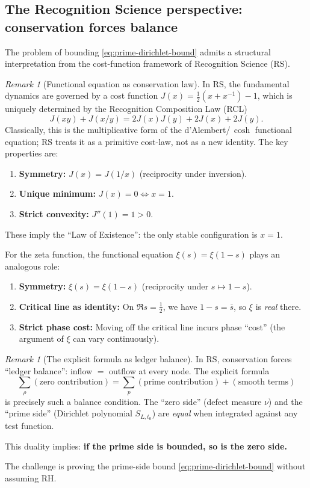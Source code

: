 \documentclass[11pt]{article}
\theoremstyle{definition}
\theoremstyle{remark}
\newtheorem{remark}[theorem]{Remark}
\theoremstyle{definition}
\begin{document}
\subsection*{The Recognition Science perspective: conservation forces balance}

The problem of bounding \eqref{eq:prime-dirichlet-bound} admits a structural interpretation from the cost-function framework of Recognition Science (RS).

\begin{remark}[Functional equation as conservation law]\label{rem:rs-conservation}
In RS, the fundamental dynamics are governed by a cost function $J(x) = \frac{1}{2}(x + x^{-1}) - 1$, which is uniquely determined by the Recognition Composition Law (RCL)
\[
  J(xy) + J(x/y) = 2J(x)J(y) + 2J(x) + 2J(y).
\]
Classically, this is the multiplicative form of the d'Alembert/\,$\cosh$ functional equation; RS treats it as a primitive cost-law, not as a new identity.
The key properties are:
\begin{enumerate}
\item \textbf{Symmetry:} $J(x) = J(1/x)$ (reciprocity under inversion).
\item \textbf{Unique minimum:} $J(x) = 0 \iff x = 1$.
\item \textbf{Strict convexity:} $J''(1) = 1 > 0$.
\end{enumerate}
These imply the ``Law of Existence'': the only stable configuration is $x = 1$.

For the zeta function, the functional equation $\xi(s) = \xi(1-s)$ plays an analogous role:
\begin{enumerate}
\item \textbf{Symmetry:} $\xi(s) = \xi(1-s)$ (reciprocity under $s \mapsto 1-s$).
\item \textbf{Critical line as identity:} On $\Re s = \tfrac{1}{2}$, we have $1-s = \overline{s}$, so $\xi$ is \emph{real} there.
\item \textbf{Strict phase cost:} Moving off the critical line incurs phase ``cost'' (the argument of $\xi$ can vary continuously).
\end{enumerate}
\end{remark}

\begin{remark}[The explicit formula as ledger balance]\label{rem:rs-ledger}
In RS, conservation forces ``ledger balance'': inflow $=$ outflow at every node. The explicit formula
\[
  \sum_\rho (\text{zero contribution}) = \sum_p (\text{prime contribution}) + (\text{smooth terms})
\]
is precisely such a balance condition. The ``zero side'' (defect measure $\nu$) and the ``prime side'' (Dirichlet polynomial $S_{L,t_0}$) are \emph{equal} when integrated against any test function.

This duality implies: \textbf{if the prime side is bounded, so is the zero side.}

The challenge is proving the prime-side bound \eqref{eq:prime-dirichlet-bound} without assuming RH.
\end{remark}
\end{document}
